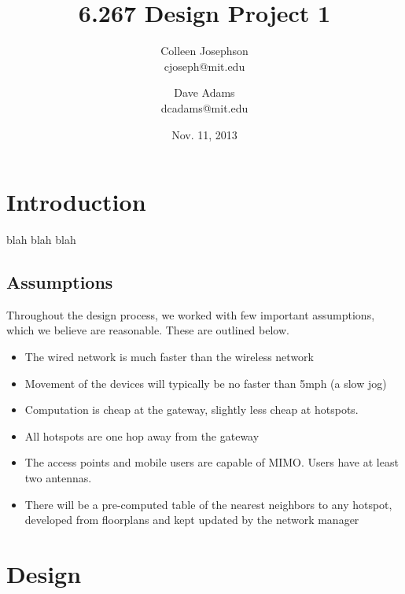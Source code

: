 \documentclass[letterpaper,10pt]{article}
\begin{document}
\title{\Large \bf 6.267 Design Project 1}
\author{
{\rm Colleen Josephson}\\
cjoseph@mit.edu
\and
{\rm Dave Adams}\\
dcadams@mit.edu
} %

\date{Nov. 11, 2013}

\maketitle


\section{Introduction}
blah blah blah

\subsection{Assumptions}

Throughout the design process, we worked with few important assumptions, which
we believe are reasonable. These are outlined below.

\begin{itemize}
\item The wired network is much faster than the wireless network
\item Movement of the devices will typically be no faster than 5mph (a slow jog)
\item Computation is cheap at the gateway, slightly less cheap at hotspots.
\item All hotspots are one hop away from the gateway
\item The access points and mobile users are capable of MIMO. Users have at 
least two antennas. 
\item There will be a pre-computed table of the nearest neighbors to any 
hotspot, developed from floorplans and kept updated by the network manager
\end{itemize}

\section{Design} \label{sec:design}
\end{document}
